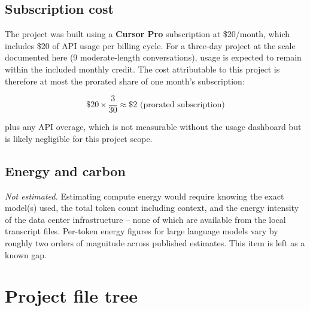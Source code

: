 \documentclass[11pt]{article}
\begin{document}
\subsection{Subscription cost}

The project was built using a \textbf{Cursor Pro} subscription at \$20/month, which includes \$20 of API usage per billing cycle. For a three-day project at the scale documented here (9 moderate-length conversations), usage is expected to remain within the included monthly credit. The cost attributable to this project is therefore at most the prorated share of one month's subscription:

\[
  \$20 \times \frac{3}{30} \approx \$2\text{ (prorated subscription)}
\]

\noindent plus any API overage, which is not measurable without the usage dashboard but is likely negligible for this project scope.

\subsection{Energy and carbon}

\textit{Not estimated.} Estimating compute energy would require knowing the exact model(s) used, the total token count including context, and the energy intensity of the data center infrastructure -- none of which are available from the local transcript files. Per-token energy figures for large language models vary by roughly two orders of magnitude across published estimates. This item is left as a known gap.

\section{Project file tree}
\end{document}
